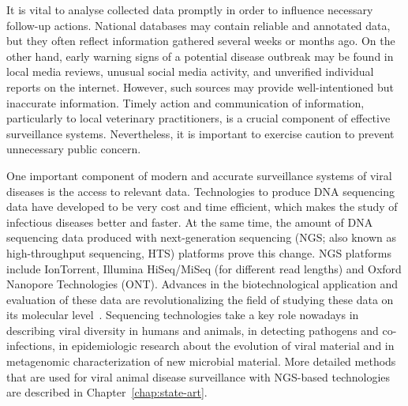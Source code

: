 It is vital to analyse collected data promptly in order to influence necessary follow-up actions. National databases may contain reliable and annotated data, but they often reflect information gathered several weeks or months ago. On the other hand, early warning signs of a potential disease outbreak may be found in local media reviews, unusual social media activity, and unverified individual reports on the internet. However, such sources may provide well-intentioned but inaccurate information. Timely action and communication of information, particularly to local veterinary practitioners, is a crucial component of effective surveillance systems. Nevertheless, it is important to exercise caution to prevent unnecessary public concern.

One important component of modern and accurate surveillance systems of viral diseases is the access to relevant data. Technologies to produce DNA sequencing data have developed to be very cost and time efficient, which makes the study of infectious diseases better and faster. At the same time, the amount of DNA sequencing data produced with next-generation sequencing (NGS; also known as high-throughput sequencing, HTS) platforms prove this change. NGS platforms include IonTorrent, Illumina HiSeq/MiSeq (for different read lengths) and Oxford Nanopore Technologies (ONT). Advances in the biotechnological application and evaluation of these data are revolutionalizing the field of studying these data on its molecular level~\cite{suminda2022high}. Sequencing technologies take a key role nowadays in describing viral diversity in humans and animals, in detecting pathogens and co-infections, in epidemiologic research about the evolution of viral material and in metagenomic characterization of new microbial material. More detailed methods that are used for viral animal disease surveillance with NGS-based technologies are described in Chapter~\ref{chap:state-art}.

